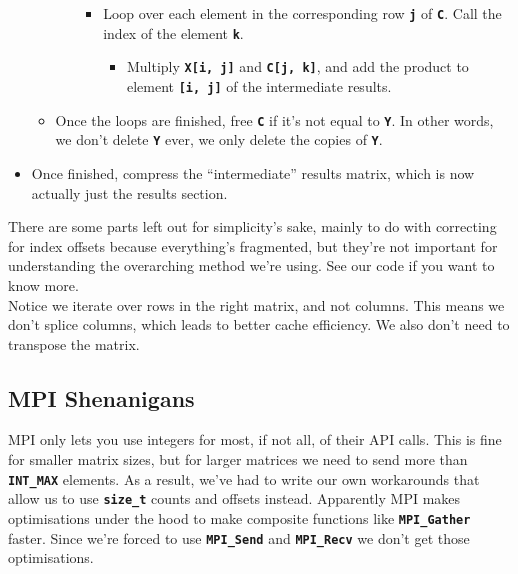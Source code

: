 \documentclass[11pt,leqno]{article}
\providecommand{\tightlist}{%
  \setlength{\itemsep}{0pt}\setlength{\parskip}{0pt}}
\begin{document}
\begin{flushleft}
\begin{itemize}[label=\textcolor{CtpMauve}{$-$}]
\begin{itemize}[label=\textcolor{CtpLavender}{$-$}]
\begin{itemize}[label=\textcolor{CtpTeal}{$-$}]
\begin{itemize}[label=\textcolor{CtpBlue}{$-$}]
                  \item Loop over each element in the corresponding row \textbf{\texttt{j}} of \textbf{\texttt{C}}. Call the index of the element \textbf{\texttt{k}}.
                  \begin{itemize}[label=\textcolor{CtpPink}{$-$}]
                          \tightlist
                    \item Multiply \textbf{\texttt{X[i, j]}} and \textbf{\texttt{C[j, k]}}, and add the product to element \textbf{\texttt{[i, j]}} of the intermediate results.
                  \end{itemize}
                \end{itemize}
        \end{itemize}


          \item Once the loops are finished, free \textbf{\texttt{C}} if it's not equal to \textbf{\texttt{Y}}. In other words, we don't delete \textbf{\texttt{Y}} ever, we only delete the copies of \textbf{\texttt{Y}}.
                \end{itemize}

  \item Once finished, compress the ``intermediate'' results matrix, which is now actually just the results section.

\end{itemize}
There are some parts left out for simplicity's sake, mainly to do with
correcting for index offsets because everything's fragmented, but
they're not important for understanding the overarching method we're using. See our code if you want to know more. \\[2 ex]

Notice we iterate over rows in the right matrix, and not columns. This
means we don't splice columns, which leads to better cache efficiency.
We also don't need to transpose the matrix.

\subsection{MPI Shenanigans}\label{mpi-shenanigans}


MPI only lets you use integers for most, if not all, of their API calls. This is fine for smaller matrix sizes, but for larger matrices we need to send more than \textbf{\texttt{INT_MAX}} elements. As a result, we've had to write our own workarounds that allow us to use \textbf{\texttt{size_t}} counts and offsets instead. Apparently MPI makes optimisations under the hood to make composite functions like \textbf{\texttt{MPI_Gather}} faster. Since we're forced to use \textbf{\texttt{MPI_Send}} and \textbf{\texttt{MPI_Recv}} we don't get those optimisations. \\[2 ex]


\end{flushleft}
\end{document}
